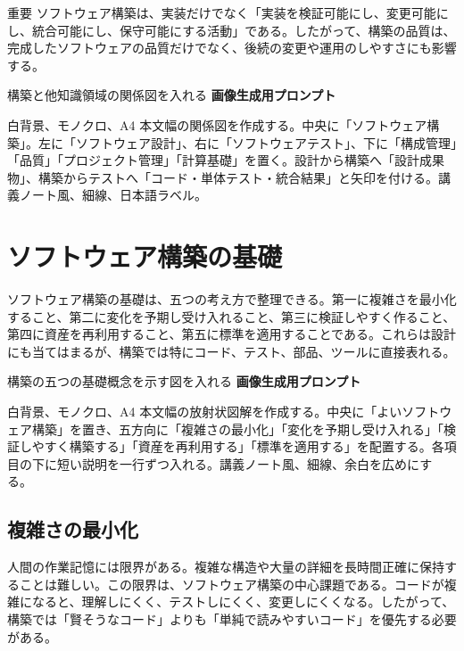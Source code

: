 \documentclass[a4paper,11pt,ja=standard,xelatex]{bxjsarticle}
\begin{document}
\begin{keybox}{重要}
ソフトウェア構築は、実装だけでなく「実装を検証可能にし、変更可能にし、統合可能にし、保守可能にする活動」である。したがって、構築の品質は、完成したソフトウェアの品質だけでなく、後続の変更や運用のしやすさにも影響する。
\end{keybox}

\begin{todobox}{構築と他知識領域の関係図を入れる}
\textbf{画像生成用プロンプト}

白背景、モノクロ、A4 本文幅の関係図を作成する。中央に「ソフトウェア構築」。左に「ソフトウェア設計」、右に「ソフトウェアテスト」、下に「構成管理」「品質」「プロジェクト管理」「計算基礎」を置く。設計から構築へ「設計成果物」、構築からテストへ「コード・単体テスト・統合結果」と矢印を付ける。講義ノート風、細線、日本語ラベル。
\end{todobox}

\section{ソフトウェア構築の基礎}

ソフトウェア構築の基礎は、五つの考え方で整理できる。第一に複雑さを最小化すること、第二に変化を予期し受け入れること、第三に検証しやすく作ること、第四に資産を再利用すること、第五に標準を適用することである。これらは設計にも当てはまるが、構築では特にコード、テスト、部品、ツールに直接表れる。

\begin{todobox}{構築の五つの基礎概念を示す図を入れる}
\textbf{画像生成用プロンプト}

白背景、モノクロ、A4 本文幅の放射状図解を作成する。中央に「よいソフトウェア構築」を置き、五方向に「複雑さの最小化」「変化を予期し受け入れる」「検証しやすく構築する」「資産を再利用する」「標準を適用する」を配置する。各項目の下に短い説明を一行ずつ入れる。講義ノート風、細線、余白を広めにする。
\end{todobox}

\subsection{複雑さの最小化}

人間の作業記憶には限界がある。複雑な構造や大量の詳細を長時間正確に保持することは難しい。この限界は、ソフトウェア構築の中心課題である。コードが複雑になると、理解しにくく、テストしにくく、変更しにくくなる。したがって、構築では「賢そうなコード」よりも「単純で読みやすいコード」を優先する必要がある。
\end{document}
